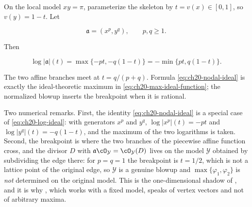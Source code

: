 \begin{example}
\label{ex:ch20-nodal-max}
On the local model $xy=\pi$, parameterize the skeleton by
$t=v(x)\in[0,1]$, so $v(y)=1-t$.  Let

\[
              \mathfrak a=(x^p,y^q),\qquad p,q\geq1.
\]

Then

\begin{equation}
\label{eq:ch20-nodal-ideal}
 \log|\mathfrak a|(t)
   =\max\{-pt,-q(1-t)\}
   =-\min\{pt,q(1-t)\}.
\end{equation}

The two affine branches meet at $t=q/(p+q)$.  Formula
\eqref{eq:ch20-nodal-ideal} is exactly the ideal-theoretic maximum in
\eqref{eq:ch20-max-ideal-function}; the normalized blowup inserts the
breakpoint when it is rational.

Two numerical remarks.  First, the identity
\eqref{eq:ch20-nodal-ideal} is a special case of
\eqref{eq:ch20-log-ideal}: with generators $x^p$ and $y^q$,
$\log|x^p|(t)=-pt$ and $\log|y^q|(t)=-q(1-t)$, and the maximum of the
two logarithms is taken.  Second, the breakpoint is where the two branches
of the piecewise affine function cross, and the divisor $D$ with
$\mathfrak a\cO_{\mathcal Y}=\cO_{\mathcal Y}(D)$ lives on the model
$\mathcal Y$ obtained by subdividing the edge there: for
$p=q=1$ the breakpoint is $t=1/2$, which is not a lattice point of the
original edge, so $\mathcal Y$ is a genuine blowup and
$\max\{\varphi_1,\varphi_2\}$ is \emph{not} determined on the original
model.  This is the one-dimensional shadow of
, and it is why
, which works with a fixed model, speaks of
vertex vectors and not of arbitrary maxima.
\end{example}

